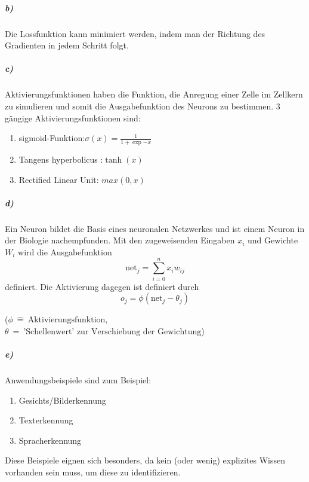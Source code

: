 \subparagraph{b)}
Die Lossfunktion kann minimiert werden, indem man der Richtung des Gradienten in jedem Schritt folgt.

\subparagraph{c)}
Aktivierungsfunktionen haben die Funktion, die Anregung einer Zelle im Zellkern zu simulieren und somit die Ausgabefunktion des Neurons zu bestimmen.
3 gängige Aktivierungsfunktionen sind:
\begin{enumerate}
  \item sigmoid-Funktion:$\sigma(x)=\frac{1}{1+\exp{-x}}$
  \item Tangens hyperbolicus :$\tanh(x)$
  \item Rectified Linear Unit: $max(0, x)$
\end{enumerate}

\subparagraph{d)}
Ein Neuron bildet die Basis eines neuronalen Netzwerkes und ist einem Neuron in der Biologie nachempfunden. Mit den zugeweisenden Eingaben $x_i$ und Gewichte $W_i$ wird die
Ausgabefunktion
\begin{equation}
  \text{net}_j=\sum_{i=0}^{n} x_i w_{ij}
\end{equation}
definiert.
Die Aktivierung dagegen ist definiert durch
\begin{equation}
  o_j=\phi(\text{net}_j-\theta_j)
\end{equation}
\begin{center}
 \tiny {($ \phi \: \hat{=} \:\text{Aktivierungsfunktion}$, $ \theta \: \hat{=} \:\text{'Schellenwert' zur Verschiebung der Gewichtung}$)}
\end{center}

\subparagraph{e)}
Anwendungsbeispiele sind zum Beispiel:
\begin{enumerate}
  \item Gesichts/Bilderkennung
  \item Texterkennung
  \item Spracherkennung
\end{enumerate}
Diese Beispiele eignen sich besonders, da kein (oder wenig)  explizites Wissen vorhanden sein muss, um diese zu identifizieren.
